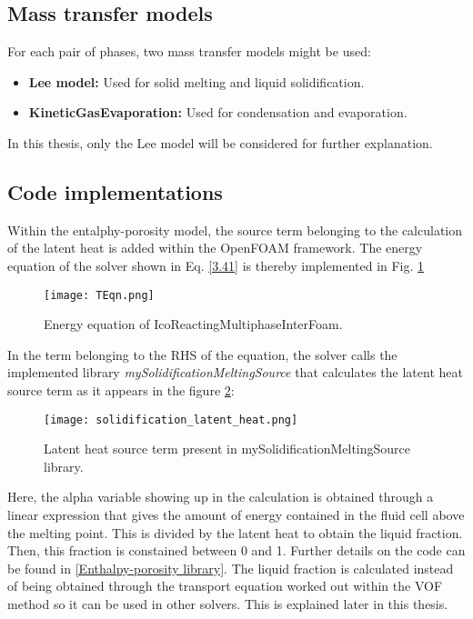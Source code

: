 \subsection{Mass transfer models}
For each pair of phases, two mass transfer models might be used:
\begin{itemize}
	\item \textbf{Lee model:} Used for solid melting and liquid solidification.
	\item \textbf{KineticGasEvaporation:} Used for condensation and evaporation.
\end{itemize}
In this thesis, only the Lee model will be considered for further explanation.


\subsection{Code implementations}

\setlength{\parindent}{0.5cm} Within the entalphy-porosity model, the source term belonging to the calculation of the latent heat is added within the OpenFOAM framework. The energy equation of the solver shown in Eq. \ref{3.41} is thereby implemented in Fig. \ref{3.8fig}
\begin{figure}[h!]
	\centering
	\texttt{[image: TEqn.png]}\hfill	
	\caption{Energy equation of IcoReactingMultiphaseInterFoam.}
	\label{3.8fig}
\end{figure}
In the term belonging to the RHS of the equation, the solver calls the implemented library \textit{mySolidificationMeltingSource} that calculates the latent heat source term as it appears in the figure \ref{3.9fig}:
\begin{figure}[h!]
	\centering
	\texttt{[image: solidification\_latent\_heat.png]}\hfill
	\caption{Latent heat source term present in mySolidificationMeltingSource library.}
	\label{3.9fig}
\end{figure}

\noindent Here, the alpha variable showing up in the calculation is obtained through a linear expression that gives the amount of energy contained in the fluid cell above the melting point. This is divided by the latent heat to obtain the liquid fraction. Then, this fraction is constained between 0 and 1. Further details on the code can be found in \ref{Enthalpy-porosity library}. The liquid fraction is calculated instead of being obtained through the transport equation worked out within the VOF method so it can be used in other solvers. This is explained later in this thesis.

